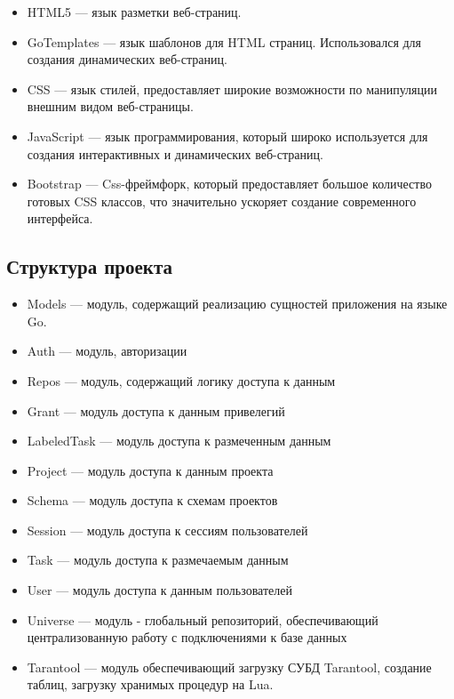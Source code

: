 \begin{itemize}
    \item HTML5 --- язык разметки веб-страниц.
    
    \item GoTemplates --- язык шаблонов для HTML страниц. Использовался для создания динамических веб-страниц.\cite{gotemplate}

    \item CSS --- язык стилей, предоставляет широкие возможности по 
            манипуляции внешним видом веб-страницы.

    \item JavaScript --- язык программирования, который широко 
        используется для создания интерактивных и динамических 
        веб-страниц.  

    \item Bootstrap\cite{bootstrap4docs} --- Css-фреймфорк, 
        который предоставляет большое количество готовых
        CSS классов, что значительно ускоряет создание
        современного интерфейса.
\end{itemize}

\subsection{Структура проекта}

\begin{itemize}
    \item Models --- модуль, содержащий реализацию сущностей приложения на языке Go.
    \item Auth ---   модуль, авторизации
    \item Repos --- модуль, содержащий логику доступа к данным
        \item Grant --- модуль доступа к данным привелегий
        \item LabeledTask --- модуль доступа к размеченным данным
        \item Project --- модуль доступа к данным проекта
        \item Schema --- модуль доступа к схемам проектов
        \item Session --- модуль доступа к сессиям пользователей
        \item Task --- модуль доступа к размечаемым данным
        \item User --- модуль доступа к данным пользователей
    \item Universe --- модуль - глобальный репозиторий, обеспечивающий централизованную работу с подключениями к базе данных
    \item Tarantool --- модуль обеспечивающий загрузку СУБД Tarantool, создание таблиц, загрузку хранимых процедур на Lua.
\end{itemize}


